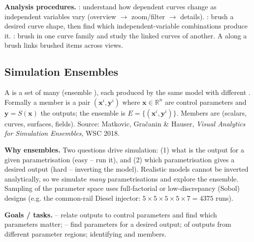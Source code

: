 \textbf{Analysis procedures.} : understand how
dependent curves change as independent variables vary
(overview $\to$ zoom/filter $\to$ details). : brush a
desired curve shape, then find which independent-variable combinations produce
it. : brush in one curve family and study the
linked curves of another. A  along a brush links brushed
items across views.

\subsection{Simulation Ensembles}

\begin{keybox}[Definition]
A  is a set of many 
(ensemble ), each produced by the same model with different
. Formally a member is a pair
$(\mathbf{x}^i,\mathbf{y}^i)$ where $\mathbf{x}\in\mathbb{R}^n$ are control
parameters and $\mathbf{y}=S(\mathbf{x})$ the outputs; the ensemble is
$E=\{(\mathbf{x}^i,\mathbf{y}^i)\}$. Members are  (scalars, curves, surfaces, fields). Source: Matkovic,
Gra\v{c}anin \& Hauser, \emph{Visual Analytics for Simulation Ensembles}, WSC 2018.
\end{keybox}

\textbf{Why ensembles.} Two questions drive simulation: (1) what is the output
for a given parametrisation (easy -- run it), and (2) which parametrisation
gives a desired output (hard -- inverting the model). Realistic models cannot be
inverted analytically, so we simulate \emph{many} parametrisations and explore
the ensemble. Sampling of the parameter space uses full-factorial or
low-discrepancy (Sobol) designs (e.g. the common-rail Diesel injector:
$5\times5\times5\times5\times7 = 4375$ runs).

\textbf{Goals / tasks.}  -- relate outputs to
control parameters and find which parameters matter;  -- find parameters for a desired output;  of
outputs from different parameter regions; identifying  and
 members.

